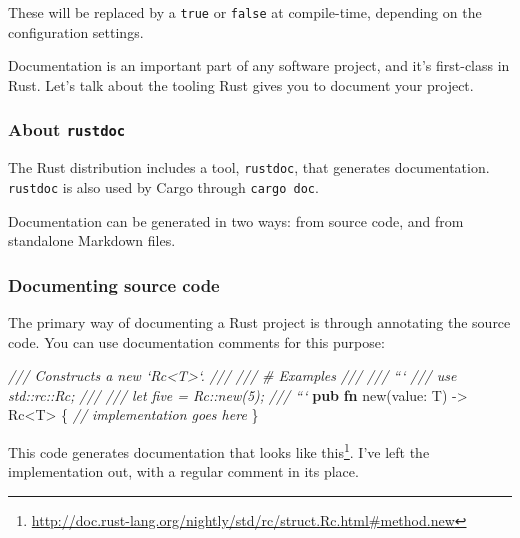 \documentclass[a4paper,]{book}
\newenvironment{Shaded}{\begin{snugshade}}{\end{snugshade}}
\newcommand{\KeywordTok}[1]{\textcolor[rgb]{0.13,0.29,0.53}{\textbf{{#1}}}}
\newcommand{\CommentTok}[1]{\textcolor[rgb]{0.56,0.35,0.01}{\textit{{#1}}}}
\newcommand{\NormalTok}[1]{{#1}}
\renewcommand{\href}[2]{#2\footnote{\url{#1}}}
\begin{document}
These will be replaced by a \texttt{true} or \texttt{false} at
compile-time, depending on the configuration settings.


Documentation is an important part of any software project, and it's
first-class in Rust. Let's talk about the tooling Rust gives you to
document your project.

\subsubsection{\texorpdfstring{About
\texttt{rustdoc}}{About rustdoc}}\label{about-rustdoc}

The Rust distribution includes a tool, \texttt{rustdoc}, that generates
documentation. \texttt{rustdoc} is also used by Cargo through
\texttt{cargo\ doc}.

Documentation can be generated in two ways: from source code, and from
standalone Markdown files.

\subsubsection{Documenting source code}\label{documenting-source-code}

The primary way of documenting a Rust project is through annotating the
source code. You can use documentation comments for this purpose:

\begin{Shaded}
\begin{Highlighting}[]
\CommentTok{/// Constructs a new `Rc<T>`.}
\CommentTok{///}
\CommentTok{/// # Examples}
\CommentTok{///}
\CommentTok{/// ```}
\CommentTok{/// use std::rc::Rc;}
\CommentTok{///}
\CommentTok{/// let five = Rc::new(5);}
\CommentTok{/// ```}
\KeywordTok{pub} \KeywordTok{fn} \NormalTok{new(value: T) -> Rc<T> \{}
    \CommentTok{// implementation goes here}
\NormalTok{\}}
\end{Highlighting}
\end{Shaded}

This code generates documentation that looks
\href{http://doc.rust-lang.org/nightly/std/rc/struct.Rc.html\#method.new}{like
this}. I've left the implementation out, with a regular comment in its
place.
\end{document}
